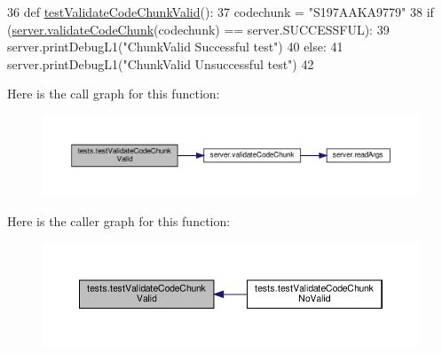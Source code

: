 \begin{DoxyCode}
36 \textcolor{keyword}{def }\hyperlink{namespacetests_a4d364f808ece8a89192b5fa6bd230906}{testValidateCodeChunkValid}():
37      codechunk = \textcolor{stringliteral}{"S197AAKA9779"}
38      \textcolor{keywordflow}{if} (\hyperlink{namespaceserver_ad6f5a9a8c8e233d0537dc69dc6de98f6}{server.validateCodeChunk}(codechunk) == server.SUCCESSFUL):
39           server.printDebugL1(\textcolor{stringliteral}{"ChunkValid Successful test"})
40      \textcolor{keywordflow}{else}:
41           server.printDebugL1(\textcolor{stringliteral}{"ChunkValid Unsuccessful test"})
42 
\end{DoxyCode}
Here is the call graph for this function\+:
\nopagebreak
\begin{figure}[H]
\begin{center}
\leavevmode
\includegraphics[width=350pt]{namespacetests_a4d364f808ece8a89192b5fa6bd230906_cgraph}
\end{center}
\end{figure}
Here is the caller graph for this function\+:
\nopagebreak
\begin{figure}[H]
\begin{center}
\leavevmode
\includegraphics[width=350pt]{namespacetests_a4d364f808ece8a89192b5fa6bd230906_icgraph}
\end{center}
\end{figure}

